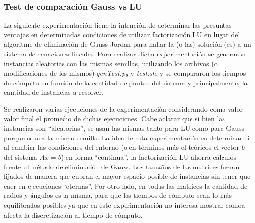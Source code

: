 \subsubsection{Test de comparación Gauss vs LU}
La siguiente experimentación tiene la intención de determinar las presuntas ventajas en determinadas condiciones de utilizar factorización LU en lugar del algoritmo de eliminación de Gauss-Jordan para hallar la (o las) solución (es) a un sistema de ecuaciones lineales. Para realizar dicha experimentación se generaron instancias aleatorias con las mismas semillas, utilizando los archivos (o modificaciones de los mismos) \emph{genTest.py} y \emph{test.sh}, y se compararon los tiempos de cómputo en función de la cantidad de puntos del sistema y principalmente, la cantidad de instancias a resolver. 

Se realizaron varias ejecuciones de la experimentación considerando como valor valor final el promedio de dichas ejecuciones. Cabe aclarar que si bien las instancias son ``aleatorias'', se usan las mismas tanto para LU como para Gauss porque se usa la misma semilla. La idea de esta experimentación es determinar si al cambiar las condiciones del entorno (o en términos más el teóricos el vector $b$ del sistema $Ax=b$) en forma ``continua'', la factorización LU ahorra cálculos frente al método de eliminación de Gauss. Los tamaños de las matrices fueron fijados de manera que cubran el mayor espacio posible de instancias sin tener que caer en ejecuciones ``eternas''. Por otro lado, en todas las matrices la cantidad de radios y ángulos es la misma, para que los tiempos de cómputo sean lo más equilibrados posibles ya que en este experimentación no interesa mostrar comoa afecta la discretización al tiempo de cómputo.
